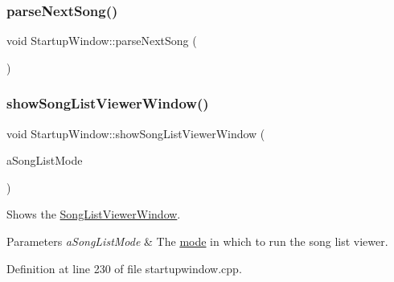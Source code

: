 \subsubsection{\texorpdfstring{parse\+Next\+Song()}{parseNextSong()}}
{\footnotesize\ttfamily void Startup\+Window\+::parse\+Next\+Song (\begin{DoxyParamCaption}{ }\end{DoxyParamCaption})\hspace{0.3cm}{\ttfamily [private]}}

\mbox{\label{class_startup_window_adc6941b3def8ed33a8925bef6ad82449}} 
\subsubsection{\texorpdfstring{show\+Song\+List\+Viewer\+Window()}{showSongListViewerWindow()}}
{\footnotesize\ttfamily void Startup\+Window\+::show\+Song\+List\+Viewer\+Window (\begin{DoxyParamCaption}\item[{\mbox{\hyperlink{class_song_list_viewer_window_a6f23a68c416173f6b571a2cc4990a927}{Song\+List\+Viewer\+Window\+::\+S\+O\+N\+G\+\_\+\+L\+I\+S\+T\+\_\+\+M\+O\+DE}}}]{a\+Song\+List\+Mode }\end{DoxyParamCaption})\hspace{0.3cm}{\ttfamily [private]}}



Shows the \mbox{\hyperlink{class_song_list_viewer_window}{Song\+List\+Viewer\+Window}}. 


\begin{DoxyParams}{Parameters}
{\em a\+Song\+List\+Mode} & The \mbox{\hyperlink{class_song_list_viewer_window_a6f23a68c416173f6b571a2cc4990a927}{mode}} in which to run the song list viewer. \\
\hline
\end{DoxyParams}


Definition at line 230 of file startupwindow.\+cpp.


